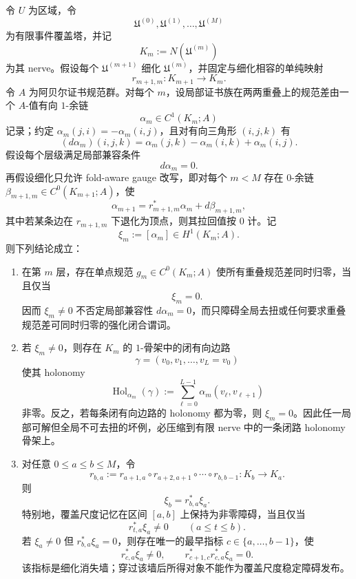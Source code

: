 \begin{theorem}\label{distill:persistent_homology_persistence_modules_and_constructible_sheaf_persistence-sheaf_and_cosheaf_persistence-event-cover-tower-holonomy-skeleton}
令 \(U\) 为区域，令
\[
\mathfrak U^{(0)},\mathfrak U^{(1)},\dots,\mathfrak U^{(M)}
\]
为有限事件覆盖塔，并记
\[
K_m:=N(\mathfrak U^{(m)})
\]
为其 nerve。假设每个 \(\mathfrak U^{(m+1)}\) 细化 \(\mathfrak U^{(m)}\)，并固定与细化相容的单纯映射
\[
r_{m+1,m}:K_{m+1}\to K_m .
\]
令 \(A\) 为阿贝尔证书规范群。对每个 \(m\)，设局部证书族在两两重叠上的规范差由一个 \(A\)-值有向 \(1\)-余链
\[
\alpha_m\in C^1(K_m;A)
\]
记录；约定 \(\alpha_m(j,i)=-\alpha_m(i,j)\)，且对有向三角形 \((i,j,k)\) 有
\[
(d\alpha_m)(i,j,k)=\alpha_m(j,k)-\alpha_m(i,k)+\alpha_m(i,j).
\]
假设每个层级满足局部兼容条件
\[
d\alpha_m=0.
\]
再假设细化只允许 fold-aware gauge 改写，即对每个 \(m<M\) 存在 \(0\)-余链 \(\beta_{m+1,m}\in C^0(K_{m+1};A)\)，使
\[
\alpha_{m+1}=r_{m+1,m}^{*}\alpha_m+d\beta_{m+1,m},
\]
其中若某条边在 \(r_{m+1,m}\) 下退化为顶点，则其拉回值按 \(0\) 计。记
\[
\xi_m:=[\alpha_m]\in H^1(K_m;A).
\]
则下列结论成立：
\begin{enumerate}
  \item 在第 \(m\) 层，存在单点规范 \(g_m\in C^0(K_m;A)\) 使所有重叠规范差同时归零，当且仅当
  \[
  \xi_m=0.
  \]
  因而 \(\xi_m\neq 0\) 不否定局部兼容性 \(d\alpha_m=0\)，而只障碍全局去扭或任何要求重叠规范差可同时归零的强化闭合谓词。

  \item 若 \(\xi_m\neq 0\)，则存在 \(K_m\) 的 \(1\)-骨架中的闭有向边路
  \[
  \gamma=(v_0,v_1,\dots,v_L=v_0)
  \]
  使其 holonomy
  \[
  \operatorname{Hol}_{\alpha_m}(\gamma)
  :=\sum_{\ell=0}^{L-1}\alpha_m(v_\ell,v_{\ell+1})
  \]
  非零。反之，若每条闭有向边路的 holonomy 都为零，则 \(\xi_m=0\)。因此任一局部可解但全局不可去扭的坏例，必压缩到有限 nerve 中的一条闭路 holonomy 骨架上。

  \item 对任意 \(0\le a\le b\le M\)，令
  \[
  r_{b,a}:=r_{a+1,a}\circ r_{a+2,a+1}\circ\cdots\circ r_{b,b-1}:K_b\to K_a.
  \]
  则
  \[
  \xi_b=r_{b,a}^{*}\xi_a.
  \]
  特别地，覆盖尺度记忆在区间 \([a,b]\) 上保持为非零障碍，当且仅当
  \[
  r_{t,a}^{*}\xi_a\neq 0\qquad(a\le t\le b).
  \]
  若 \(\xi_a\neq0\) 但 \(r_{b,a}^{*}\xi_a=0\)，则存在唯一的最早指标 \(c\in\{a,\dots,b-1\}\)，使
  \[
  r_{c,a}^{*}\xi_a\neq0,
  \qquad
  r_{c+1,c}^{*}r_{c,a}^{*}\xi_a=0.
  \]
  该指标是细化消失墙；穿过该墙后所得对象不能作为覆盖尺度稳定障碍发布。
\end{enumerate}
\end{theorem}
